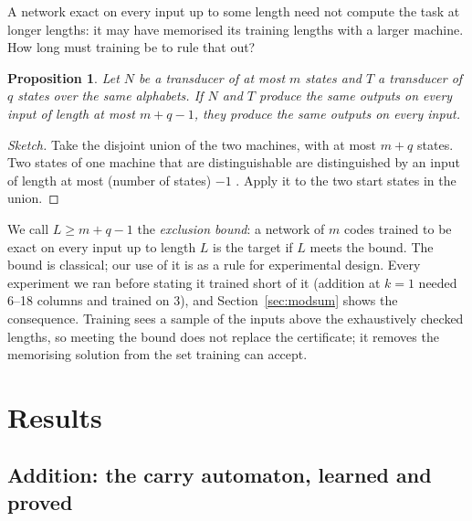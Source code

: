 \documentclass[11pt]{article}
\newtheorem{proposition}{Proposition}
\begin{document}
A network exact on every input up to some length need not compute the task at longer lengths: it
may have memorised its training lengths with a larger machine. How long must training be to rule
that out?

\begin{proposition}
Let $N$ be a transducer of at most $m$ states and $T$ a transducer of $q$ states over the same
alphabets. If $N$ and $T$ produce the same outputs on every input of length at most $m + q - 1$,
they produce the same outputs on every input.
\end{proposition}
\begin{proof}[Sketch]
Take the disjoint union of the two machines, with at most $m + q$ states. Two states of one machine
that are distinguishable are distinguished by an input of length at most (number of states)
$- 1$ \citep{moore-1956-gedanken-experiments-sequential-machines,hopcroft-ullman-1979}. Apply it to the two start states in the
union.
\end{proof}
We call $L \ge m + q - 1$ the \emph{exclusion bound}: a network of $m$ codes trained to be exact on
every input up to length $L$ is the target if $L$ meets the bound. The bound is classical; our use
of it is as a rule for experimental design. Every experiment we ran before stating it trained
short of it (addition at $k = 1$ needed 6--18 columns and trained on 3), and Section~\ref{sec:modsum}
shows the consequence. Training sees a sample of the inputs above the exhaustively checked lengths,
so meeting the bound does not replace the certificate; it removes the memorising solution from the
set training can accept.

\section{Results}

\subsection{Addition: the carry automaton, learned and proved}
\label{sec:matrix}
\end{document}
